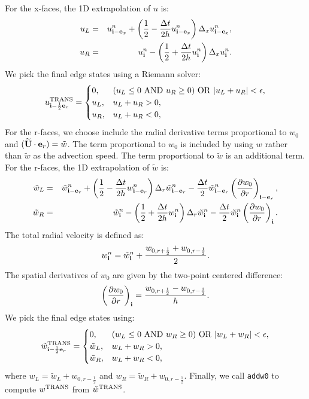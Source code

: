 \documentclass[11pt]{article}
\def\half  {\frac{1}{2}}
\def\dt    {\Delta t}
\def\trans {\rm TRANS}
\def\eb    {{\bf e}}
\def\ib    {{\bf i}}
\def\Ubt   {\widetilde{\bf U}}
\def\wt    {\tilde{w}}
\begin{document}
For the x-faces, the 1D extrapolation of $u$ is:
\begin{eqnarray}
u_L &=& u_{\ib-\eb_x}^n + \left(\half - \frac{\dt}{2h}u_{\ib-\eb_x}^n\right)\Delta_x u_{\ib-\eb_x}^n, \\
u_R &=& u_{\ib}^n - \left(\half + \frac{\dt}{2h}u_{\ib}^n\right)\Delta_x u_{\ib}^n.
\end{eqnarray}
We pick the final edge states using a Riemann solver:
\begin{equation}
u^{\trans}_{\ib-\half\eb_x} =
\begin{cases}
0, & (u_L \le 0 ~ {\rm AND} ~ u_R \ge 0) ~ {\rm OR} ~ |u_L + u_R| < \epsilon, \\
u_L, & u_L + u_R > 0, \\
u_R, & u_L + u_R < 0, \\
\end{cases}
\end{equation}
For the r-faces, we choose include the radial derivative terms proportional to $w_0$ and $(\Ubt\cdot\eb_r) = \wt$.  The term proportional to $w_0$ is included by using $w$ rather than $\wt$ as the advection speed.  The term proportional to $\wt$ is an additional term.  For the r-faces, the 1D extrapolation of $\wt$ is:
\begin{eqnarray}
\wt_L &=& \wt_{\ib-\eb_r}^n + \left(\half - \frac{\dt}{2h}w_{\ib-\eb_r}^n\right)\Delta_r \wt_{\ib-\eb_r}^n - \frac{\dt}{2}\wt_{\ib-\eb_r}^n\left(\frac{\partial w_0}{\partial r}\right)_{\ib-\eb_r},\label{Radial utrans_L} \\
\wt_R &=& \wt_{\ib}^n - \left(\half + \frac{\dt}{2h}w_{\ib}^n\right)\Delta_r \wt_{\ib}^n - \frac{\dt}{2}\wt_{\ib}^n\left(\frac{\partial w_0}{\partial r}\right)_{\ib}.\label{Radial utrans_R}
\end{eqnarray}
The total radial velocity is defined as:
\begin{equation}
w_{\ib}^n = \wt_{\ib}^n + \frac{w_{0,r+\half}+w_{0,r-\half}}{2}.\label{Total Radial Velocity}
\end{equation}
The spatial derivatives of $w_0$ are given by the two-point centered difference:
\begin{equation}
\left(\frac{\partial w_0}{\partial r}\right)_{\ib} = \frac{w_{0,r+\half}-w_{0,r-\half}}{h}.\label{Radial Derivative of w_0}
\end{equation}
We pick the final edge states using:
\begin{equation}
\wt^{\trans}_{\ib-\half\eb_r} =
\begin{cases}
0, & (w_L \le 0 ~ {\rm AND} ~ w_R \ge 0) ~ {\rm OR} ~ |w_L + w_R| < \epsilon, \\
\wt_L, & w_L + w_R > 0, \\
\wt_R, & w_L + w_R < 0, \\
\end{cases}
\end{equation}
where $w_L = \wt_L + w_{0,r-\half}$ and $w_R = \wt_R + w_{0,r-\half}$.  Finally, we call {\tt addw0} to compute $w^{\trans}$ from $\wt^{\trans}$.
\end{document}
